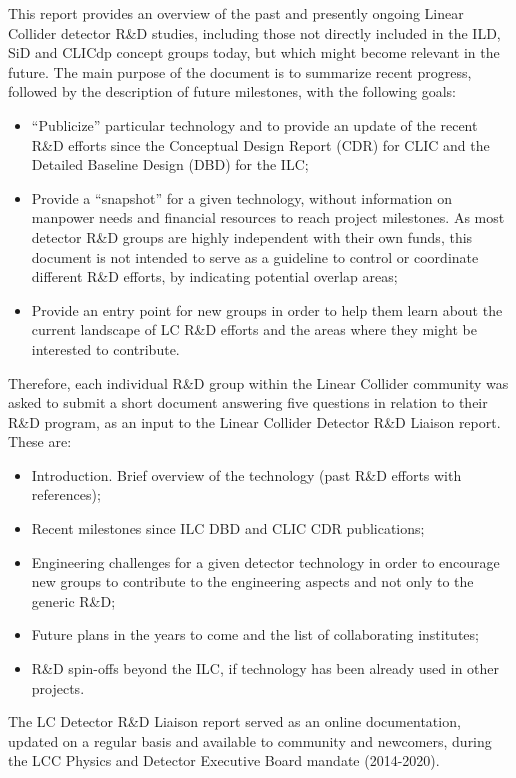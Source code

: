 \documentclass[10pt,final]{report}
\begin{document}
This report provides an overview of the past and presently ongoing Linear Collider
detector R\&D studies, including those not directly included in the ILD, SiD and CLICdp
concept groups today, but which might become relevant in the future. The main purpose of
the document is to summarize recent progress, followed by the description of future
milestones, with the following goals:
\begin{itemize}
	\item ``Publicize'' particular technology and to provide an update of the recent R\&D efforts
since the Conceptual Design Report (CDR) for CLIC and the Detailed Baseline
Design (DBD) for the ILC;
	\item Provide a ``snapshot'' for a given technology, without information on manpower needs
and financial resources to reach project milestones. As most detector R\&D groups
are highly independent with their own funds, this document is not intended to serve
as a guideline to control or coordinate different R\&D efforts, by indicating potential
overlap areas;
	\item Provide an entry point for new groups in order to help them learn about the current
landscape of LC R\&D efforts and the areas where they might be interested to
contribute.
\end{itemize}
Therefore, each individual R\&D group within the Linear Collider community was asked to
submit a short document answering five questions in relation to their R\&D program, as an
input to the Linear Collider Detector R\&D Liaison report. These are:
\begin{itemize}
	\item Introduction. Brief overview of the technology (past R\&D efforts with references);
	\item Recent milestones since ILC DBD and CLIC CDR publications;
	\item Engineering challenges for a given detector technology in order to encourage new
groups to contribute to the engineering aspects and not only to the generic R\&D;
	\item Future plans in the years to come and the list of collaborating institutes;
	\item R\&D spin-offs beyond the ILC, if technology has been already used in other projects.
\end{itemize}
The LC Detector R\&D Liaison report served as an online documentation, updated on a
regular basis and available to community and newcomers, during the LCC Physics and
Detector Executive Board mandate (2014-2020).
\end{document}
